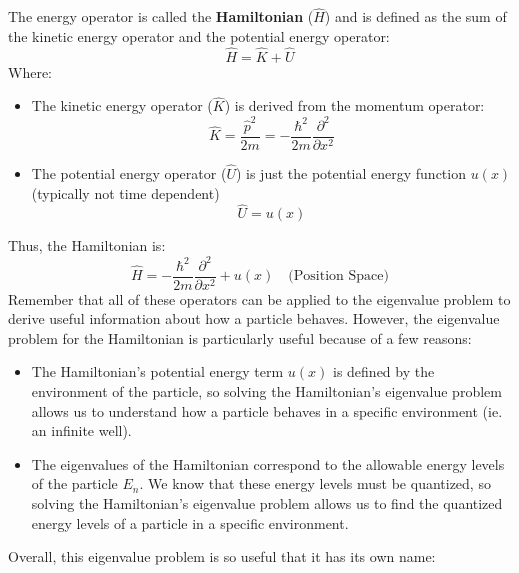 \documentclass[12pt]{article}
\begin{document}
The energy operator is called the \textbf{Hamiltonian} ($\hat{H}$) and is defined as the sum of the kinetic energy operator and the potential energy operator:
\[\hat{H} = \hat{K} + \hat{U}\]
Where:
\begin{itemize}
    \item The kinetic energy operator ($\hat{K}$) is derived from the momentum operator:
    \[\hat{K} = \frac{\hat{p}^2}{2m} = -\frac{\hbar^2}{2m} \frac{\partial^2}{\partial x^2}\]
    \item The potential energy operator ($\hat{U}$) is just the potential energy function $u(x)$ (typically not time dependent)
    \[\hat{U} = u(x)\]
\end{itemize}
Thus, the Hamiltonian is:
\[\boxed{\hat{H} = -\frac{\hbar^2}{2m} \frac{\partial^2}{\partial x^2} + u(x)\quad \text{(Position Space)}}\]
\newpage\noindent
Remember that all of these operators can be applied to the eigenvalue problem to derive useful information about how a particle behaves. However, the eigenvalue problem for the Hamiltonian is particularly useful because of a few reasons:
\begin{itemize}
    \item The Hamiltonian's potential energy term $u(x)$ is defined by the environment of the particle, so solving the Hamiltonian's eigenvalue problem allows us to understand how a particle behaves in a specific environment (ie. an infinite well).
    \item The eigenvalues of the Hamiltonian correspond to the allowable energy levels of the particle $E_n$. We know that these energy levels must be quantized, so solving the Hamiltonian's eigenvalue problem allows us to find the quantized energy levels of a particle in a specific environment.
\end{itemize}
Overall, this eigenvalue problem is so useful that it has its own name:
\end{document}
